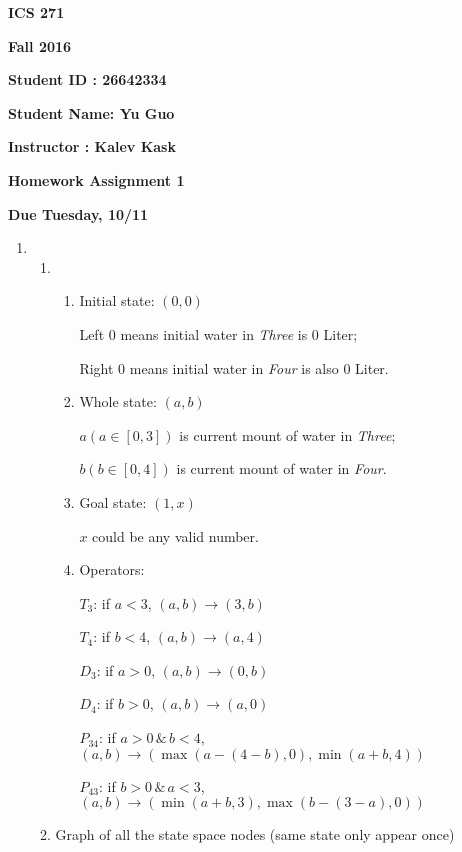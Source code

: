 \documentclass{article}
\begin{document}
{\bf ICS 271}

{\bf Fall 2016}

{\bf Student ID : 26642334}

{\bf Student Name: Yu Guo}

{\bf Instructor : Kalev Kask}

{\bf Homework Assignment 1}

{\bf Due Tuesday, 10/11}




\begin{enumerate}

\item

\begin{enumerate}
\item

\begin{enumerate}
\item Initial state: $(0,0)$

  Left $0$ means initial water in \emph{Three} is $0$ Liter;

  Right $0$ means initial water in \emph{Four} is also $0$ Liter.

\item Whole state: $(a,b)$

  $a(a\in[0,3])$ is current mount of water in \emph{Three};

  $b(b\in[0,4])$ is current mount of water in \emph{Four}. 

\item Goal state: $(1,x)$

  $x$ could be any valid number.

\item Operators: 

$T_3$: if $a<3$, $(a,b)\rightarrow(3,b)$ 

$T_4$: if $b<4$, $(a,b)\rightarrow(a,4)$ 

$D_3$: if $a>0$, $(a,b)\rightarrow(0,b)$ 

$D_4$: if $b>0$, $(a,b)\rightarrow(a,0)$

$P_{34}$: if $a>0\, \&\, b<4$, $(a,b)\rightarrow(\max(a-(4-b),0),\min(a+b,4))$

$P_{43}$: if $b>0\, \&\, a<3$, $(a,b)\rightarrow(\min(a+b,3),\max(b-(3-a),0))$


\end{enumerate}

\item Graph of all the state space nodes (same state only appear once)


\end{enumerate}
\end{enumerate}
\end{document}
